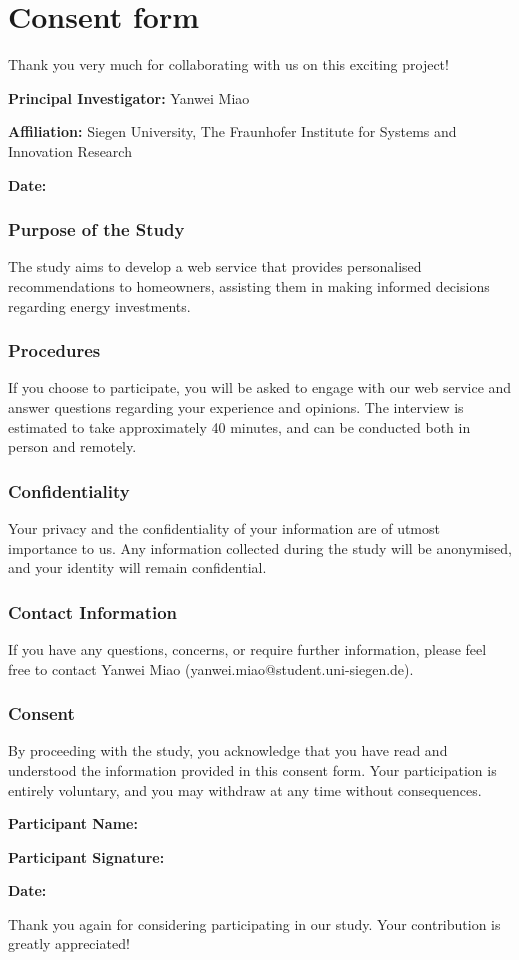 \clearpage %

\chapter{Consent form}
\label{appendix:consentform}

Thank you very much for collaborating with us on this exciting project!

\textbf{Principal Investigator:} Yanwei Miao

\textbf{Affiliation:} Siegen University, The Fraunhofer Institute for Systems and Innovation Research

\textbf{Date:}


\subsection*{Purpose of the Study}

The study aims to develop a web service that provides personalised recommendations to homeowners, 
assisting them in making informed decisions regarding energy investments. 


\subsection*{Procedures}

If you choose to participate, you will be asked to engage with our web service and answer questions regarding your experience and opinions. 
The interview is estimated to take approximately 40 minutes, 
and can be conducted both in person and remotely. 


\subsection*{Confidentiality}

Your privacy and the confidentiality of your information are of utmost importance to us. 
Any information collected during the study will be anonymised, and your identity will remain confidential.


\subsection*{Contact Information}

If you have any questions, concerns, or require further information, 
please feel free to contact Yanwei Miao (yanwei.miao@student.uni-siegen.de).


\subsection*{Consent}

By proceeding with the study, you acknowledge that you have read and understood the information provided in this consent form. 
Your participation is entirely voluntary, and you may withdraw at any time without consequences. 


\textbf{Participant Name:}

\textbf{Participant Signature:}

\textbf{Date:} 


Thank you again for considering participating in our study. 
Your contribution is greatly appreciated! 